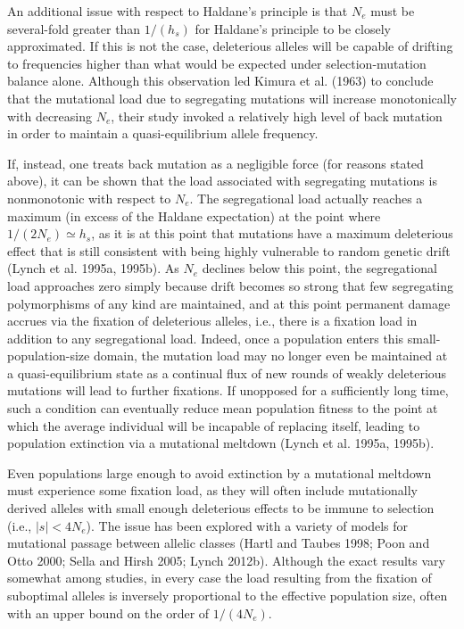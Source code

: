 \documentclass{article}
\begin{document}
An additional issue with respect to Haldane's principle is that  $ N_{e} $ must be several-fold greater than  $ 1/(h_{s}) $ for Haldane's principle to be closely approximated. If this is not the case, deleterious alleles will be capable of drifting to frequencies higher than what would be expected under selection-mutation balance alone. Although this observation led Kimura et al. (1963) to conclude that the mutational load due to segregating mutations will increase monotonically with decreasing  $ N_{e} $, their study invoked a relatively high level of back mutation in order to maintain a quasi-equilibrium allele frequency.

If, instead, one treats back mutation as a negligible force (for reasons stated above), it can be shown that the load associated with segregating mutations is nonmonotonic with respect to  $ N_e $. The segregational load actually reaches a maximum (in excess of the Haldane expectation) at the point where  $ 1/(2N_e) \simeq h_s $, as it is at this point that mutations have a maximum deleterious effect that is still consistent with being highly vulnerable to random genetic drift (Lynch et al. 1995a, 1995b). As  $ N_e $ declines below this point, the segregational load approaches zero simply because drift becomes so strong that few segregating polymorphisms of any kind are maintained, and at this point permanent damage accrues via the fixation of deleterious alleles, i.e., there is a fixation load in addition to any segregational load. Indeed, once a population enters this small-population-size domain, the mutation load may no longer even be maintained at a quasi-equilibrium state as a continual flux of new rounds of weakly deleterious mutations will lead to further fixations. If unopposed for a sufficiently long time, such a condition can eventually reduce mean population fitness to the point at which the average individual will be incapable of replacing itself, leading to population extinction via a mutational meltdown (Lynch et al. 1995a, 1995b).

Even populations large enough to avoid extinction by a mutational meltdown must experience some fixation load, as they will often include mutationally derived alleles with small enough deleterious effects to be immune to selection (i.e.,  $ |s| < 4N_e $). The issue has been explored with a variety of models for mutational passage between allelic classes (Hartl and Taubes 1998; Poon and Otto 2000; Sella and Hirsh 2005; Lynch 2012b). Although the exact results vary somewhat among studies, in every case the load resulting from the fixation of suboptimal alleles is inversely proportional to the effective population size, often with an upper bound on the order of  $ 1/(4N_e) $.
\end{document}
